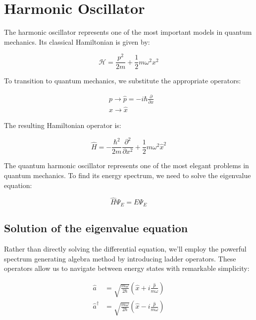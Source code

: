 \chapter{Harmonic Oscillator}

The harmonic oscillator represents one of the most important models in quantum mechanics. Its classical Hamiltonian is given by:

\begin{equation}
\mathcal{H} = \frac{p^2}{2m} + \frac{1}{2}m\omega^2 x^2
\end{equation}

To transition to quantum mechanics, we substitute the appropriate operators:

\begin{align}
&p \longrightarrow \hat{p} = -i\hbar\frac{\partial}{\partial x}  \\
&x \longrightarrow \hat{x}
\end{align}

The resulting Hamiltonian operator is:


\begin{equation}
\hat{H} = -\frac{\hbar^2}{2m}\frac{\partial^2}{\partial x^2} + \frac{1}{2}m\omega^2\hat{x}^2
\end{equation}

The quantum harmonic oscillator represents one of the most elegant problems in quantum mechanics. To find its energy spectrum, we need to solve the eigenvalue equation:

\begin{equation}
\hat{H}\Psi_E = E\Psi_E
\end{equation}

\section{Solution of the eigenvalue equation}

Rather than directly solving the differential equation, we'll employ the powerful spectrum generating algebra method by introducing ladder operators. These operators allow us to navigate between energy states with remarkable simplicity:

\begin{align}
\hat{a} &= \sqrt{\frac{m\omega}{2\hbar}}\left(\hat{x} + i\frac{\hat{p}}{m\omega}\right)  \\
\hat{a}^\dagger &= \sqrt{\frac{m\omega}{2\hbar}}\left(\hat{x} - i\frac{\hat{p}}{m\omega}\right)
\end{align}

